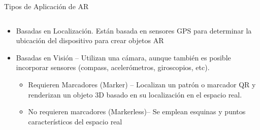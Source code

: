\begin{frame}{Tipos de Aplicación de AR \footnotemark}
\begin{columns}
\begin{column}{0.98\textwidth}
    \begin{center}

\begin{itemize}
\item Basadas en Localización. Están basada en sensores GPS para determinar la ubicación del dispositivo para crear objetos AR
\item Basadas en Visión – Utilizan una cámara, aunque también es posible incorporar sensores (compass, acelerómetros, giroscopios, etc). 
\begin{itemize}
\item  Requieren Marcadores (Marker) – Localizan un patrón o marcador QR  y renderizan un objeto 3D basado en su localización en el espacio real. 
\item  No requieren marcadores (Markerless)– Se emplean esquinas y puntos característicos del espacio real
\end{itemize}
\end{itemize}
     \end{center}

\end{column}
\end{columns}

\end{frame}


